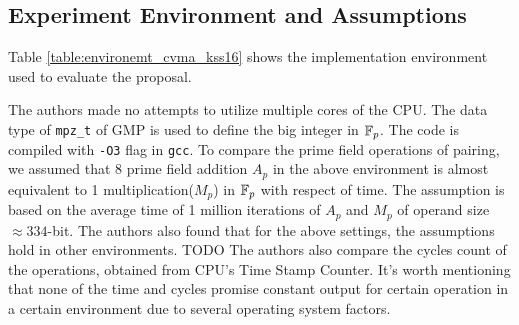 \subsection{Experiment Environment and Assumptions}
Table \ref{table:environemt_cvma_kss16} shows the implementation environment used to evaluate the proposal.  
\renewcommand{\baselinestretch}{1.5}
\begin{table}[ht]
	\centering
		\caption{Computational environment.}
	\label{table:environemt_cvma_kss16}
\end{table}
\renewcommand{\baselinestretch}{1.0}

The authors made no attempts to utilize multiple cores of the CPU.
The data type of \verb|mpz_t| of GMP is used to define the big integer in $\mathbb{F}_p$.
The code is compiled with \verb|-O3| flag in \verb|gcc|.
To compare the prime field operations of pairing, we assumed that 8 prime field addition $A_p$ in the above environment is almost equivalent to 1 multiplication($M_p$) in $\mathbb{F}_p$ with respect of time.
The assumption is based on the average time of 1 million iterations of $A_p$ and $M_p$ of operand size $\approx 334$-bit. 
The authors also found that for the above settings, the assumptions hold in other environments.
TODO %
The authors also compare the cycles count of the operations, obtained from CPU's  Time Stamp Counter.
It's worth mentioning that none of the time and cycles promise constant output for certain operation in a certain environment due to several operating system factors. 
 
